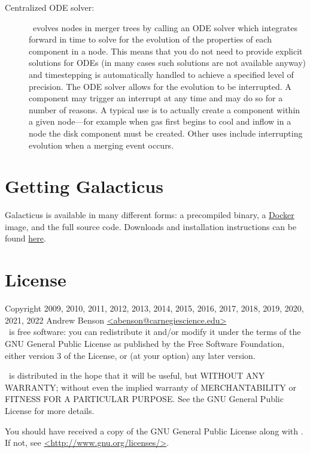 \begin{description}
 \item [Centralized ODE solver:] \glc\ evolves nodes in merger trees by calling an ODE solver which integrates forward in time to solve for the evolution of the properties of each component in a node. This means that you do not need to provide explicit solutions for ODEs (in many cases such solutions are not available anyway) and timestepping is automatically handled to achieve a specified level of precision. The ODE solver allows for the evolution to be interrupted. A component may trigger an interrupt at any time and may do so for a number of reasons. A typical use is to actually create a component within a given node---for example when gas first begins to cool and inflow in a node the disk component must be created. Other uses include interrupting evolution when a merging event occurs.
\end{description}

\section{Getting Galacticus}

Galacticus is available in many different forms: a precompiled binary, a \href{https://www.docker.com/}{Docker} image, and the full source code. Downloads and installation instructions can be found \href{https://github.com/galacticusorg/galacticus/wiki#how-do-i-install-and-use-galacticus}{here}.

\section{License}

Copyright 2009, 2010, 2011, 2012, 2013, 2014, 2015, 2016, 2017, 2018, 2019, 2020, 2021, 2022 Andrew Benson \href{mailto:abenson@carnegiescience.edu}{\normalfont \ttfamily <abenson@carnegiescience.edu>}\\

\glc\ is free software: you can redistribute it and/or modify
it under the terms of the GNU General Public License as published by
the Free Software Foundation, either version 3 of the License, or
(at your option) any later version.

\glc\ is distributed in the hope that it will be useful,
but WITHOUT ANY WARRANTY; without even the implied warranty of
MERCHANTABILITY or FITNESS FOR A PARTICULAR PURPOSE.  See the
GNU General Public License for more details.

You should have received a copy of the GNU General Public License
along with \glc.  If not, see \href{http://www.gnu.org/licenses/}{\normalfont \ttfamily <http://www.gnu.org/licenses/>}.
